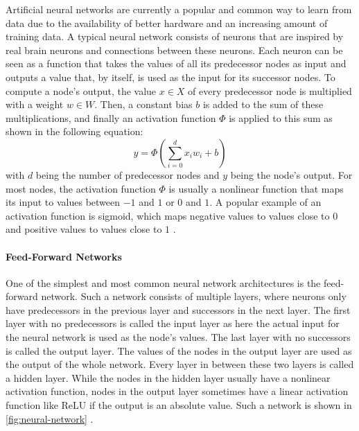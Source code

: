 Artificial neural networks are currently a popular and common way to learn from data due to the availability of better hardware and an increasing amount of training data.
A typical neural network consists of neurons that are inspired by real brain neurons and connections between these neurons.
Each neuron can be seen as a function that takes the values of all its predecessor nodes as input and outputs a value that, by itself, is used as the input for its successor nodes.
To compute a node's output, the value $x \in X$ of every predecessor node is multiplied with a weight $w \in W$.
Then, a constant bias $b$ is added to the sum of these multiplications, and finally an activation function $\Phi$ is applied to this sum as shown in the following equation:
\[
	y = \Phi(\sum_{i=0}^{d}x_iw_i + b)
\]
with $d$ being the number of predecessor nodes and $y$ being the node's output.
For most nodes, the activation function $\Phi$ is usually a nonlinear function that maps its input to values between $-1$ and $1$ or $0$ and $1$.
A popular example of an activation function is sigmoid, which maps negative values to values close to $0$ and positive values to values close to $1$ \cite[p.~4--13]{Aggarwal2018}.

\paragraph{Feed-Forward Networks}

One of the simplest and most common neural network architectures is the feed-forward network.
Such a network consists of multiple layers, where neurons only have predecessors in the previous layer and successors in the next layer.
The first layer with no predecessors is called the input layer as here the actual input for the neural network is used as the node's values.
The last layer with no successors is called the output layer.
The values of the nodes in the output layer are used as the output of the whole network.
Every layer in between these two layers is called a hidden layer.
While the nodes in the hidden layer usually have a nonlinear activation function, nodes in the output layer sometimes have a linear activation function like ReLU if the output is an absolute value. 
Such a network is shown in \cref{fig:neural-network} \cite[p.~17--20]{Aggarwal2018}.

